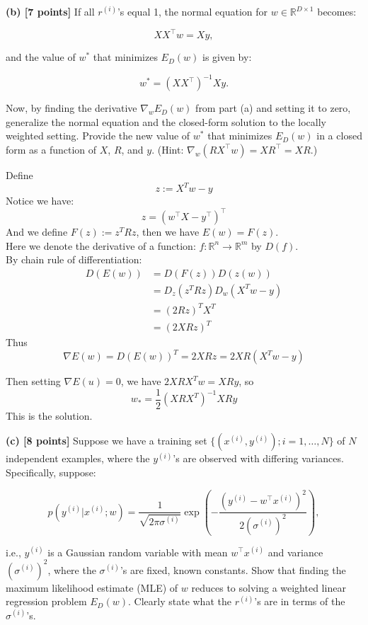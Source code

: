 \documentclass[lang=cn,11pt]{elegantbook}
\begin{document}
\textbf{(b) [7 points]} If all \( r^{(i)} \)'s equal 1, the normal equation for \( w \in \mathbb{R}^{D \times 1} \) becomes:

\[
XX^\top w = Xy,
\]

and the value of \( w^* \) that minimizes \( E_D(w) \) is given by:

\[
w^* = (XX^\top)^{-1}Xy.
\]

Now, by finding the derivative \( \nabla_w E_D(w) \) from part (a) and setting it to zero, generalize the normal equation and the closed-form solution to the locally weighted setting. Provide the new value of \( w^* \) that minimizes \( E_D(w) \) in a closed form as a function of \( X \), \( R \), and \( y \). (Hint: \( \nabla_w (RX^\top w) = XR^\top = XR \).)
\begin{solution}

    Define $$
    z := X^Tw - y
    $$
    Notice we have:
    $$
   z =  (w^\top X - y^\top)^\top 
    $$
And we define $F(z):= z^T R z$, then we have $E(w) = F(z)$.\\
Here we denote the derivative of a function: $f:\mathbb{R}^n \rightarrow \mathbb{R}^m$ by $D(f)$. \\
By chain rule of differentiation:
\begin{align}
D(E(w)) &= D(F(z)) D(z(w))      \\
& = D_z(z^T Rz) D_w(X^T w  - y) \\
&= (2Rz)^T X^T \\
&= (2XRz)^T
\end{align}
Thus
$$
\nabla E(w) = D(E(w))^T = 2XRz = 2XR(X^T w - y)
$$

Then setting $ \nabla E(u)= 0$, we have $2XRX^T w =  XRy$, so 
$$w_{*} = \frac{1}{2}(XRX^T)^{-1} XRy$$
This is the solution.
\end{solution}


\textbf{(c) [8 points]} Suppose we have a training set \( \{(x^{(i)}, y^{(i)}); i = 1, \dots, N\} \) of \( N \) independent examples, where the \( y^{(i)} \)'s are observed with differing variances. Specifically, suppose:

\[
p(y^{(i)} | x^{(i)}; w) = \frac{1}{\sqrt{2\pi\sigma^{(i)}}} \exp\left(-\frac{(y^{(i)} - w^\top x^{(i)})^2}{2(\sigma^{(i)})^2}\right),
\]

i.e., \( y^{(i)} \) is a Gaussian random variable with mean \( w^\top x^{(i)} \) and variance \( (\sigma^{(i)})^2 \), where the \( \sigma^{(i)} \)'s are fixed, known constants. Show that finding the maximum likelihood estimate (MLE) of \( w \) reduces to solving a weighted linear regression problem \( E_D(w) \). Clearly state what the \( r^{(i)} \)'s are in terms of the \( \sigma^{(i)} \)'s.
\end{document}
